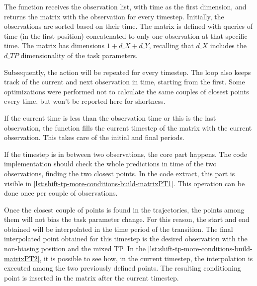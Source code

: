The function receives the observation list, with time as the first dimension, and returns the matrix with the observation for every timestep. Initially, the observations are sorted based on their time. The matrix is defined with queries of time (in the first position) concatenated to only one observation at that specific time. The matrix has dimensions $1+d\_X+d\_Y$, recalling that $d\_X$ includes the $d\_TP$ dimensionality of the task parameters. 

Subsequently, the action will be repeated for every timestep. The loop also keeps track of the current and next observation in time, starting from the first. Some optimizations were performed not to calculate the same couples of closest points every time, but won't be reported here for shortness. 

If the current time is less than the observation time or this is the last observation, the function fills the current timestep of the matrix with the current observation. This takes care of the initial and final periods.

If the timestep is in between two observations, the core part happens. The code implementation should check the whole predictions in time of the two observations, finding the two closest points. In the code extract, this part is visible in \cref{lst:shift-tp-more-conditions-build-matrixPT1}. This operation can be done once per couple of observations. 



Once the closest couple of points is found in the trajectories, the points among them will not bias the task parameter change. For this reason, the start and end obtained will be interpolated in the time period of the transition. The final interpolated point obtained for this timestep is the desired observation with the non-biasing position and the mixed TP. In the \cref{lst:shift-tp-more-conditions-build-matrixPT2}, it is possible to see how, in the current timestep, the interpolation is executed among the two previously defined points. The resulting conditioning point is inserted in the matrix after the current timestep.



